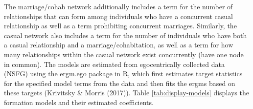 \documentclass [11pt, proquest] {uwthesis}[2015/03/03]
\begin{document}
The marriage/cohab network additionally includes a term for the number of relationships that can form among individuals who have a concurrent casual relationship as well as a term prohibiting concurrent marriages. Similarly, the casual network also includes a term for the number of individuals who have both a casual relationship and a marriage/cohabitation, as well as a term for how many relationships within the casual network exist concurrently (have one node in common). The models are estimated from egocentrically collected data (NSFG) using the ergm.ego package in R, which first estimates target statistics for the specified model terms from the data and then fits the ergms based on these targets (Krivitsky \& Morris (2017)). Table \ref{tab:display-models} displays the formation models and their estimated coefficients.
\begin{table}


\end{table}
\end{document}
